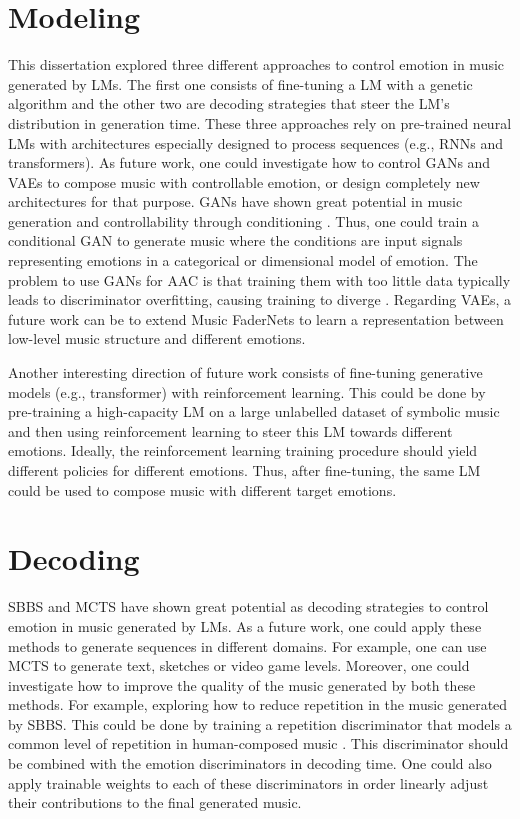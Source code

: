 \section{Modeling}

This dissertation explored three different approaches to control emotion in music generated by LMs. The first one consists of fine-tuning a LM with a genetic algorithm and the other two are decoding strategies that steer the LM's distribution in generation time. These three approaches rely on pre-trained neural LMs with architectures especially designed to process sequences (e.g., RNNs and transformers). As future work, one could investigate how to control GANs and VAEs to compose music with controllable emotion, or design completely new architectures for that purpose. GANs have shown great potential in music generation \cite{muhamed2021symbolic} and controllability through conditioning \cite{}. Thus, one could train a conditional GAN to generate music where the conditions are input signals representing emotions in a categorical or dimensional model of emotion. The problem to use GANs for AAC is that training them with too little data typically leads to discriminator overfitting, causing training to diverge \cite{karras2020training}. Regarding VAEs, a future work can be to extend Music FaderNets \cite{tan2020music} to learn a representation between low-level music structure and different emotions.

Another interesting direction of future work consists of fine-tuning generative models (e.g., transformer) with reinforcement learning. This could be done by pre-training a high-capacity LM on a large unlabelled dataset of symbolic music and then using reinforcement learning to steer this LM towards different emotions. Ideally, the reinforcement learning training procedure should yield different policies for different emotions. Thus, after fine-tuning, the same LM could be used to compose music with different target emotions.

\section{Decoding}

SBBS and MCTS have shown great potential as decoding strategies to control emotion in music generated by LMs. As a future work, one could apply these methods to generate sequences in different domains. For example, one can use MCTS to generate text, sketches or video game levels. Moreover, one could investigate how to improve the quality of the music generated by both these methods. For example, exploring how to reduce repetition in the music generated by SBBS. This could be done by training a repetition discriminator that models a common level of repetition in human-composed music \cite{holtzman2018learning}. This discriminator should be combined with the emotion discriminators in decoding time. One could also apply trainable weights to each of these discriminators in order linearly adjust their contributions to the final generated music.

